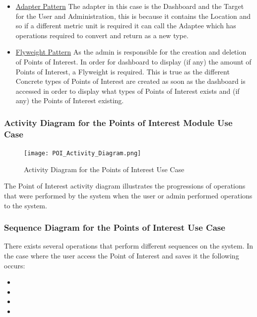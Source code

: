 \documentclass[runningheads,a4paper]{article}
\begin{document}
\begin{itemize}
\item \underline{Adapter Pattern} The adapter in this case is the Dashboard and the Target for the User and Administration, this is because it contains the Location and so if a different metric unit is required it can call the Adaptee which has operations required to convert and return as a new type.

\item \underline{Flyweight Pattern} As the admin is responsible for the creation and deletion of Points of Interest. In order for dashboard to display (if any) the amount of Points of Interest, a Flyweight is required. This is true as the different Concrete types of Points of Interest are created as soon as the dashboard is accessed  in order to display what types of Points of Interest exists and (if any) the Points of Interest existing.

\end{itemize}
\subsubsection {Activity Diagram for the Points of Interest Module Use Case}
 	\begin{figure}[H]
   	\centering
   	\texttt{[image: POI\_Activity\_Diagram.png]}
   	\caption{Activity Diagram for the Points of Interest Use Case}
	\end{figure}
	
	The Point of Interest activity diagram illustrates the progressions of operations that were performed by the system when the user or admin performed operations to the system. 
	 
\subsubsection {Sequence Diagram for the Points of Interest Use Case}
	There exists several operations that perform different sequences on the system.
	In the case where the user access the Point of Interest and saves it the following occurs:
	\begin{itemize}
		\item  
		\item
		\item
		\item
	\end{itemize}
	
\end{document}
